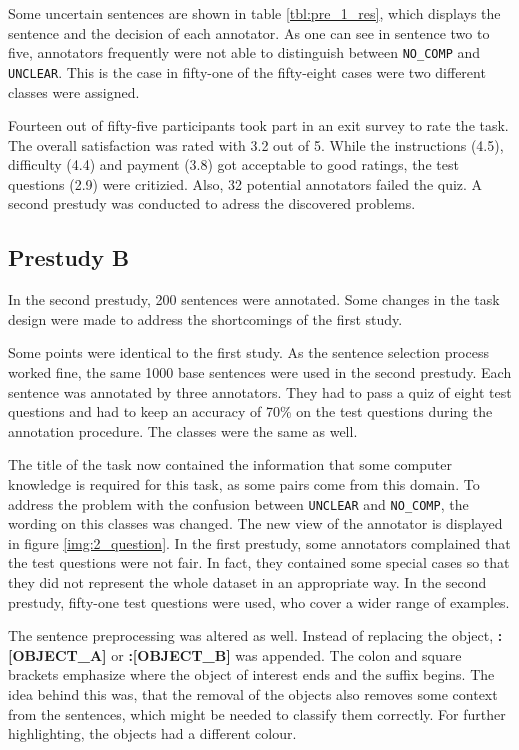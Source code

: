 Some uncertain sentences are shown in table \ref{tbl:pre_1_res}, which displays the sentence and the decision of each annotator. As one can see in sentence two to five, annotators frequently were not able to distinguish between \texttt{NO\_COMP} and \texttt{UNCLEAR}. This is the case in fifty-one of the fifty-eight cases were two different classes were assigned.\newline

Fourteen out of fifty-five participants took part in an exit survey to rate the task. The overall satisfaction was rated with 3.2 out of 5. While the instructions (4.5), difficulty (4.4) and payment (3.8) got acceptable to good ratings, the test questions (2.9) were critizied. Also, 32 potential annotators failed the quiz. A second prestudy was conducted to adress the discovered problems.







\subsection{Prestudy B}
In the second prestudy, 200 sentences were annotated. Some changes in the task design were made to address the shortcomings of the first study.

Some points were identical to the first study. As the sentence selection process worked fine, the same 1000 base sentences were used in the second prestudy.  Each sentence was annotated by three annotators. They had to pass a quiz of eight test questions and had to keep an accuracy of 70\% on the test questions during the annotation procedure. The classes were the same as well.

The title of the task now contained the information that some computer knowledge is required for this task, as some pairs come from this domain. 
To address the problem with the confusion between \texttt{UNCLEAR} and \texttt{NO\_COMP}, the wording on this classes was changed. The new view of the annotator is displayed in figure \ref{img:2_question}. 
In the first prestudy, some annotators complained that the test questions were not fair. In fact, they contained some special cases so that they did not represent the whole dataset in an appropriate way. In the second prestudy, fifty-one test questions were used, who cover a wider range of examples.

The sentence preprocessing was altered as well. Instead of replacing the object, \mbox{\textbf{{\color[HTML]{9A14B2}:{[}OBJECT\_A{]}}}} or \textbf{{\color[HTML]{6CB219}:{[}OBJECT\_B{]}}} was appended. The colon and square brackets emphasize where the object of interest ends and the suffix begins. The idea behind this was, that the removal of the objects also removes some context from the sentences, which might be needed to classify them correctly. For further highlighting, the objects had a different colour.\newline

